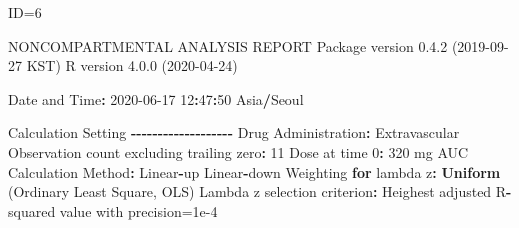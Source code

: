\documentclass[
  12pt,
]{krantz}
\newenvironment{Shaded}{\begin{snugshade}}{\end{snugshade}}
\newcommand{\ControlFlowTok}[1]{\textcolor[rgb]{0.13,0.29,0.53}{\textbf{#1}}}
\newcommand{\DecValTok}[1]{\textcolor[rgb]{0.00,0.00,0.81}{#1}}
\newcommand{\FloatTok}[1]{\textcolor[rgb]{0.00,0.00,0.81}{#1}}
\newcommand{\KeywordTok}[1]{\textcolor[rgb]{0.13,0.29,0.53}{\textbf{#1}}}
\newcommand{\NormalTok}[1]{#1}
\newcommand{\OperatorTok}[1]{\textcolor[rgb]{0.81,0.36,0.00}{\textbf{#1}}}
\newcommand{\StringTok}[1]{\textcolor[rgb]{0.31,0.60,0.02}{#1}}
\begin{document}
\begin{Shaded}
\begin{Highlighting}[]
\NormalTok{ID=}\DecValTok{6}

\NormalTok{                        NONCOMPARTMENTAL ANALYSIS REPORT}
\NormalTok{                       Package version }\DecValTok{0}\NormalTok{.}\FloatTok{4.2}\NormalTok{ (}\DecValTok{2019{-}09{-}27}\NormalTok{ KST)}
\NormalTok{                          R version }\DecValTok{4}\NormalTok{.}\FloatTok{0.0}\NormalTok{ (}\DecValTok{2020{-}04{-}24}\NormalTok{)}

\NormalTok{Date and Time}\OperatorTok{:}\StringTok{ }\DecValTok{2020{-}06{-}17} \DecValTok{12}\OperatorTok{:}\DecValTok{47}\OperatorTok{:}\DecValTok{50}\NormalTok{ Asia}\OperatorTok{/}\NormalTok{Seoul}

\NormalTok{Calculation Setting}
\OperatorTok{{-}{-}{-}{-}{-}{-}{-}{-}{-}{-}{-}{-}{-}{-}{-}{-}{-}{-}{-}}
\NormalTok{Drug Administration}\OperatorTok{:}\StringTok{ }\NormalTok{Extravascular}
\NormalTok{Observation count excluding trailing zero}\OperatorTok{:}\StringTok{ }\DecValTok{11}
\NormalTok{Dose at time }\DecValTok{0}\OperatorTok{:}\StringTok{ }\DecValTok{320}\NormalTok{ mg}
\NormalTok{AUC Calculation Method}\OperatorTok{:}\StringTok{ }\NormalTok{Linear}\OperatorTok{{-}}\NormalTok{up Linear}\OperatorTok{{-}}\NormalTok{down}
\NormalTok{Weighting }\ControlFlowTok{for}\NormalTok{ lambda z}\OperatorTok{:}\StringTok{ }\KeywordTok{Uniform}\NormalTok{ (Ordinary Least Square, OLS)}
\NormalTok{Lambda z selection criterion}\OperatorTok{:}\StringTok{ }\NormalTok{Heighest adjusted R}\OperatorTok{{-}}\NormalTok{squared value with precision=}\FloatTok{1e{-}4}



\end{Highlighting}
\end{Shaded}
\end{document}
